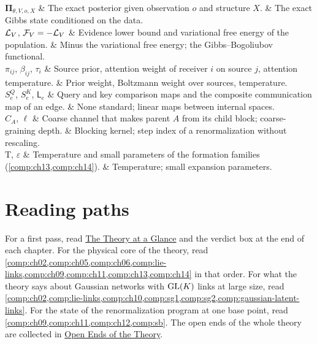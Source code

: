\begin{decoder}
$\boldsymbol\Pi_{\theta,V,o,X}$ & The exact posterior given observation $o$ and structure $X$. & The exact Gibbs state conditioned on the data. \\
$\mathcal L_V$, $\mathcal F_V=-\mathcal L_V$ & Evidence lower bound and variational free energy of the population. & Minus the variational free energy; the Gibbs--Bogoliubov functional. \\
$\pi_{ij}$, $\beta_{ij}$, $\tau_i$ & Source prior, attention weight of receiver $i$ on source $j$, attention temperature. & Prior weight, Boltzmann weight over sources, temperature. \\
$S^Q_e$, $S^K_e$, $\mathsf L_e$ & Query and key comparison maps and the composite communication map of an edge. & None standard; linear maps between internal spaces. \\
$C_A$, $\ell$ & Coarse channel that makes parent $A$ from its child block; coarse-graining depth. & Blocking kernel; step index of a renormalization without rescaling. \\
$\mathrm T$, $\varepsilon$ & Temperature and small parameters of the formation families (\cref{comp:ch13,comp:ch14}). & Temperature; small expansion parameters. \\
\end{decoder}

\section*{Reading paths}

For a first pass, read \hyperref[comp:glance]{The Theory at a Glance} and the verdict box at the end of each chapter. For the
physical core of the theory, read \cref{comp:ch02,comp:ch05,comp:ch06,comp:lie-links,comp:ch09,comp:ch11,comp:ch13,comp:ch14}
in that order. For what the theory says about Gaussian networks with $\mathrm{GL}(K)$ links at large size,
read \cref{comp:ch02,comp:lie-links,comp:ch10,comp:sg1,comp:sg2,comp:gaussian-latent-links}. For the state of the renormalization program at one
base point, read \cref{comp:ch09,comp:ch11,comp:ch12,comp:sb}. The open ends of the whole theory are
collected in \hyperref[comp:open-ends]{Open Ends of the Theory}.
